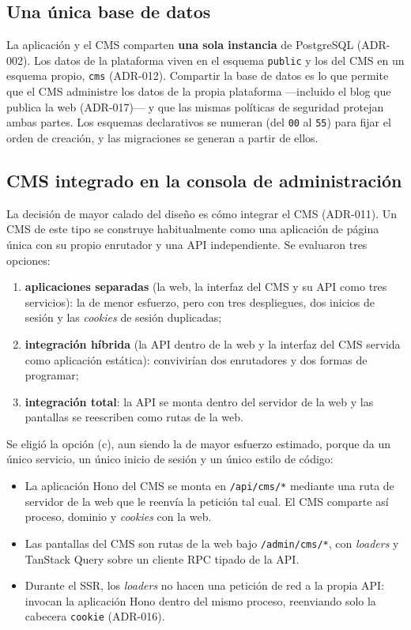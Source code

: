 \subsection{Una única base de datos}
\label{sec:dis-bd-unica}

La aplicación y el CMS comparten \textbf{una sola instancia} de PostgreSQL
(ADR-002). Los datos de la plataforma viven en el esquema \texttt{public} y
los del CMS en un esquema propio, \texttt{cms} (ADR-012). Compartir la base de
datos es lo que permite que el CMS administre los datos de la propia
plataforma ---incluido el blog que publica la web (ADR-017)--- y que las
mismas políticas de seguridad protejan ambas partes. Los esquemas
declarativos se numeran (del \texttt{00} al \texttt{55}) para fijar el orden
de creación, y las migraciones se generan a partir de ellos.

\subsection{CMS integrado en la consola de administración}
\label{sec:dis-cms-integrado}

La decisión de mayor calado del diseño es cómo integrar el CMS (ADR-011). Un
CMS de este tipo se construye habitualmente como una aplicación de página
única con su propio enrutador y una API independiente. Se evaluaron tres opciones:

\begin{enumerate}[label=(\alph*)]
  \item \textbf{aplicaciones separadas} (la web, la interfaz del CMS y su
        API como tres servicios): la de menor esfuerzo, pero con tres
        despliegues, dos inicios de sesión y las \textit{cookies} de sesión
        duplicadas;
  \item \textbf{integración híbrida} (la API dentro de la web y la interfaz
        del CMS servida como aplicación estática): convivirían dos
        enrutadores y dos formas de programar;
  \item \textbf{integración total}: la API se monta dentro del servidor de
        la web y las pantallas se reescriben como rutas de la web.
\end{enumerate}

Se eligió la opción (c), aun siendo la de mayor esfuerzo estimado, porque da
un único servicio, un único inicio de sesión y un único estilo de código:

\begin{itemize}
  \item La aplicación Hono del CMS se monta en \texttt{/api/cms/*} mediante
        una ruta de servidor de la web que le reenvía la petición tal cual.
        El CMS comparte así proceso, dominio y \textit{cookies} con la web.
  \item Las pantallas del CMS son rutas de la web bajo \texttt{/admin/cms/*},
        con \textit{loaders} y TanStack Query sobre un cliente RPC tipado de
        la API.
  \item Durante el SSR, los \textit{loaders} no hacen una petición de red a la
        propia API: invocan la aplicación Hono dentro del mismo proceso,
        reenviando solo la cabecera \texttt{cookie} (ADR-016).
\end{itemize}

